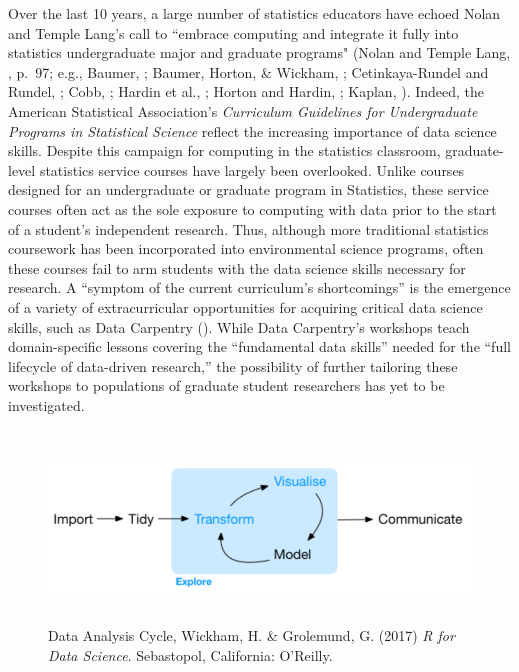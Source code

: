 \documentclass[12pt]{article}
\begin{document}
\quad Over the last 10 years, a large number of statistics educators have echoed
Nolan and Temple Lang's call to ``embrace computing and integrate it fully into 
statistics undergraduate major and graduate programs" (Nolan and Temple Lang, 
\citeyear{nolan}, p.\ 97; e.g., Baumer, \citeyear{baumer_datascience}; Baumer, Horton, 
\& Wickham, \citeyear{horton_takingachance}; Cetinkaya-Rundel and Rundel, 
\citeyear{mine}; Cobb, \citeyear{cobb}; Hardin et al., \citeyear{hardin}; Horton
and Hardin, \citeyear{horton_thinkwithdata}; Kaplan, \citeyear{kaplan}). Indeed,
the American Statistical Association's \citeyear{asa} \emph{Curriculum
Guidelines for Undergraduate Programs in Statistical Science} reflect the
increasing importance of data science skills. Despite this campaign for
computing in the statistics classroom, graduate-level statistics service courses
have largely been overlooked. Unlike courses designed for an undergraduate or
graduate program in Statistics, these service courses often act as the sole
exposure to computing with data prior to the start of a student's independent
research. Thus, although more traditional statistics coursework has been 
incorporated into environmental science programs, often these courses fail to
arm students with the data science skills necessary for research. A ``symptom of
the current curriculum's shortcomings'' \citep[p.\ 547]{hampton} is the
emergence of a variety of extracurricular opportunities for acquiring critical
data science skills, such as Data Carpentry (\citeyear{data-carpentry}). While
Data Carpentry's workshops teach domain-specific lessons covering the
``fundamental data skills'' needed for the ``full lifecycle of data-driven
research,'' the possibility of further tailoring these workshops to populations
of graduate student researchers has yet to be investigated.

\begin{figure}[t!]
    \centering
    \includegraphics[width = \textwidth, height = 2in]{images/cycle.png}
    \caption{Data Analysis Cycle, Wickham, H. \& Grolemund, G. (2017) \emph{R 
    for Data Science}. Sebastopol, California: O'Reilly.}
\label{fig:cycle}
\end{figure} 
\end{document}

